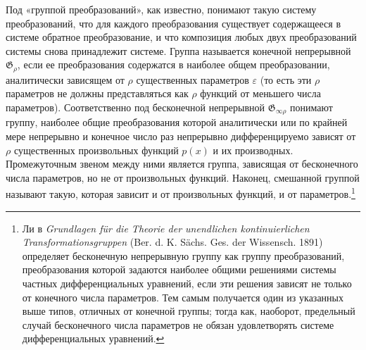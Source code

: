 \documentclass[11pt]{article}
\providecommand{\G}{\mathfrak G}
\providecommand{\eps}{\varepsilon}
\begin{document}
Под «группой преобразований», как известно, понимают такую систему преобразований, что для каждого преобразования существует содержащееся в системе обратное преобразование, и что композиция любых двух преобразований системы снова принадлежит системе. Группа называется конечной непрерывной \(\G_\rho\), если ее преобразования содержатся в наиболее общем преобразовании, аналитически зависящем от \(\rho\) существенных параметров \(\eps\) (то есть эти \(\rho\) параметров не должны представляться как \(\rho\) функций от меньшего числа параметров). Соответственно под бесконечной непрерывной \(\G_{\infty\rho}\) понимают группу, наиболее общие преобразования которой аналитически или по крайней мере непрерывно и конечное число раз непрерывно дифференцируемо зависят от \(\rho\) существенных произвольных функций \(p(x)\) и их производных. Промежуточным звеном между ними является группа, зависящая от бесконечного числа параметров, но не от произвольных функций. Наконец, смешанной группой называют такую, которая зависит и от произвольных функций, и от параметров.\footnote{Ли в \emph{Grundlagen für die Theorie der unendlichen kontinuierlichen Transformationsgruppen} (Ber. d. K. Sächs. Ges. der Wissensch. 1891) определяет бесконечную непрерывную группу как группу преобразований, преобразования которой задаются наиболее общими решениями системы частных дифференциальных уравнений, если эти решения зависят не только от конечного числа параметров. Тем самым получается один из указанных выше типов, отличных от конечной группы; тогда как, наоборот, предельный случай бесконечного числа параметров не обязан удовлетворять системе дифференциальных уравнений.}
\end{document}
